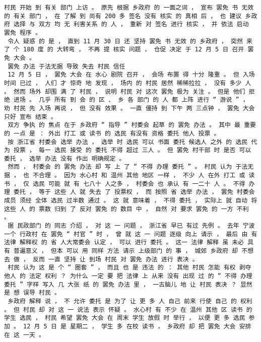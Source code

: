 \documentclass{article}
\begin{document}
\begin{Verbatim}[commandchars=\\\{\}]
 村民 开始 到 有关 部门 上访 。 原先 根据 乡政府 的 一面之词 ， 宣布 罢免 书 无效 的 有关 部门 ， 在 了解 到 尚有 200 多 签名 没有 核实 的 真相 后 ， 也 建议 乡政府 选择 与 双方 均 无 利害关系 的 人 ， 重新 对 签名 进行 核实 ， 并 依法 启动 罢免 程序 。 
 令人 疑惑 的 是 ， 直到 11 月 30 日 还 坚持 罢免 书 无效 的 乡政府 ， 突然 来 了 个 180 度 的 大转弯 ， 不再 提 核实 问题 ， 仓促 决定 于 12 月 5 日 召开 罢免 大会 。 
 罢免 办法 于法无据 导致 失去 村民 信任 
 12 月 5 日 ， 罢免 大会 在 水心 剧院 召开 ， 会场 布置 得 十分 隆重 。 但 入场 时间 已过 ， 人们 才 惊奇 地 发现 ， 场内 的 村民 居然 稀稀拉拉 ， 没有 多少 人 。 然而 场外 却围 满 了 村民 ， 说明 村民 对 这次 罢免 极为 关注 。 但是 他们 拒绝 进场 。 几乎 所有 到 会 的 区 、 乡 各 部门 的 人 都 上阵 进行 “ 游说 ” ， 劝 村民 先 入场 再说 ， 但 没有 效果 。 一直 僵持 到 下午 两 三点钟 ， 罢免 大会 只好 宣布 结束 。 
 双方 争执 的 焦点 在于 乡政府 “ 指导 ” 村委会 起草 的 罢免 办法 。 其中 最 重要 的 一点 是 ： 外出 打工 或 读书 的 选民 有没有 资格 委托 他人 投票 。 
 按 浙江省 村委会 选举 办法 ， 选举 时 选民 可以 书面 委托 候选人 之外 的 选民 代为 投票 ， 每一 选民 接受 的 委托 不得 超过 三人 。 但 罢免 村干部 时 是否 可以 委托 ， 选举 办法 没有 作出 明确规定 。 
 然而 ， 村委会 的 罢免 办法 却 写 上 了 “ 不得 办理 委托 ” 。 村民 认为 于法无据 ， 也 不合理 。 因为 水心村 和 温州 其他 地区 一样 ， 不少 人 在外 打工 或 读书 ， 仅 选民 可能 就 有 七八十 人之多 ， 村委会 也 承认 有 一二十 人 。 不得 办理 委托 ， 等于 这些 人 就 失去 了 投票权 ， 而 按照 省 选举 办法 ， 罢免 村委会 成员 须经 全体 选民 过半数 通过 。 这 就 意味着 ， 不得 委托 ， 实际上 就 自动 将 这些 人 的 票数 归到 了 反对 罢免 的 数目 中 ， 自然 对 要求 罢免 的 一方 不利 。 
 据 民政部门 的 同志 介绍 ， 对 这 一 问题 ， 浙江省 早已 有过 先例 。 去年 宁波 一个 行政村 在 罢免 “ 村官 ” 时 ， 曾 就 这 一 问题 逐级 向上 请示 ， 最后 由 有 法律 解释权 的 省 人大常委会 认定 ， 可以 进行 委托 。 这一 法律 解释 虽 未必 具有 普遍意义 ， 但本 可以 用 同样 方法 请示 上级部门 的 事 ， 城郊 乡政府 却 不想 去 做 ， 反而 一直 坚持 让 到场 村民 对 罢免 办法 进行 表决 。 
 村民 认为 这 是 个 “ 圈套 ” ， 而且 也 是 违法 的 ： 其他 村民 怎能 有权 剥夺 他人 的 法定 权利 ？ 为什么 一定 要 把 法律 上 从来 没有 出现 过 的 “ 不得 办理 委托 ” 字样 写入 几 大张 纸 的 罢免 办法 里 ， 一古脑儿 地 让 村民 表决 ？ 显然 是 想 误导 村民 。 
 乡政府 解释 说 ， 不 允许 委托 是 为了 让 更 多 人 自己 前来 行使 自己 的 权利 。 但 村民 却 对 这 一 说法 表示 怀疑 。 水心村 有 不少 在 温州 其他 区 读书 的 学生 选民 ， 村民 希望 罢免 大会 在 周末 学生 放假 时 举行 ， 以便 更 多 选民 参加 。 12 月 5 日 是 星期二 ， 学生 多 在校 读书 ， 乡政府 却 把 罢免 大会 安排 在 这 一天 。 

\end{Verbatim}
\end{document}
